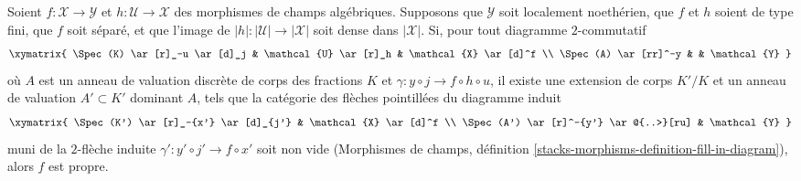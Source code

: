 \begin{lemma}
\label{lemma-refined-valuative-criterion-proper}
Soient $f : \mathcal{X} \to \mathcal{Y}$ et $h : \mathcal{U} \to \mathcal{X}$
des morphismes de champs algébriques. Supposons que $\mathcal{Y}$ soit
localement noethérien, que $f$ et $h$ soient de type fini,
que $f$ soit séparé, et que l'image de
$|h| : |\mathcal{U}| \to |\mathcal{X}|$ soit dense dans $|\mathcal{X}|$.
Si, pour tout diagramme $2$-commutatif
$$
\xymatrix{
\Spec(K) \ar[r]_-u \ar[d]_j & \mathcal{U} \ar[r]_h & \mathcal{X} \ar[d]^f \\
\Spec(A) \ar[rr]^-y & & \mathcal{Y}
}
$$
où $A$ est un anneau de valuation discrète de corps des fractions $K$
et $\gamma : y \circ j \to f \circ h \circ u$, il
existe une extension de corps $K'/K$ et un anneau de valuation $A' \subset K'$
dominant $A$, tels que la catégorie des flèches pointillées du
diagramme induit
$$
\xymatrix{
\Spec(K') \ar[r]_-{x'} \ar[d]_{j'} & \mathcal{X} \ar[d]^f \\
\Spec(A') \ar[r]^-{y'} \ar@{..>}[ru] & \mathcal{Y}
}
$$
muni de la $2$-flèche induite $\gamma' : y' \circ j' \to f \circ x'$
soit non vide (Morphismes de champs, définition
\ref{stacks-morphisms-definition-fill-in-diagram}), alors $f$ est propre.
\end{lemma}

